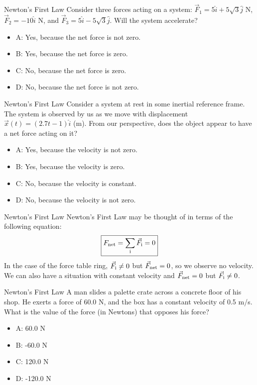 \documentclass{beamer}
\begin{document}
\begin{frame}{Newton's First Law}
Consider three forces acting on a system: $\vec{F}_1 = 5\hat{i}+5\sqrt{3}\hat{j}$ N, $\vec{F}_2 = -10\hat{i}$ N, and $\vec{F}_3 = 5\hat{i}-5\sqrt{3}\hat{j}$.  Will the system accelerate?
\begin{itemize}
\item A: Yes, because the net force is not zero.
\item B: Yes, because the net force is zero.
\item C: No, because the net force is zero.
\item D: No, because the net force is not zero.
\end{itemize}
\end{frame}

\begin{frame}{Newton's First Law}
Consider a system at rest in some inertial reference frame.  The system is observed by us as we move with displacement $\vec{x}(t) = (2.7t - 1)\hat{i}$ (m).  From our perspective, does the object appear to have a net force acting on it?
\begin{itemize}
\item A: Yes, because the velocity is not zero.
\item B: Yes, because the velocity is zero.
\item C: No, because the velocity is constant.
\item D: No, because the velocity is not zero.
\end{itemize}
\end{frame}

\begin{frame}{Newton's First Law}
Newton's First Law may be thought of in terms of the following equation:
\begin{equation}
\boxed{F_{\rm net} = \sum_{\rm i} \vec{F}_{\rm i} = 0}
\label{eq:firstlaw}
\end{equation}
In the case of the force table ring, $\vec{F}_{\rm i} \neq 0$ but $\vec{F}_{\rm net} = 0$, so we observe no velocity.  We can also have a situation with constant velocity and $\vec{F}_{\rm net} = 0$  but $\vec{F}_{\rm i} \neq 0$.
\end{frame}

\begin{frame}{Newton's First Law}
A man slides a palette crate across a concrete floor of his shop.  He exerts a force of 60.0 N, and the box has a constant velocity of 0.5 m/s.  What is the value of the force (in Newtons) that opposes his force?
\begin{itemize}
\item A: 60.0 N
\item B: -60.0 N
\item C: 120.0 N
\item D: -120.0 N
\end{itemize}
\end{frame}
\end{document}
